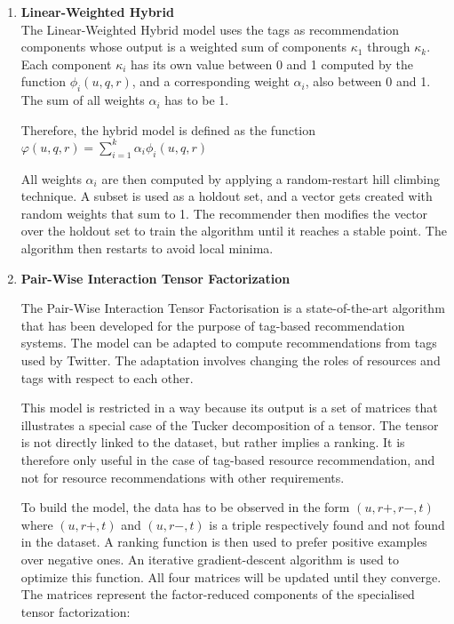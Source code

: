 \documentclass{article}
\begin{document}
\begin{enumerate}
\item \textbf{Linear-Weighted Hybrid}\\

The Linear-Weighted Hybrid model uses the tags as recommendation components whose output is a weighted sum of components $\kappa_1$ through $\kappa_k$. 
Each component $\kappa_i$ has its own value between 0 and 1 computed by the function $\phi_i (u,q,r)$, and a corresponding weight $\alpha_i$, also between
0 and 1. The sum of all weights $\alpha_i$ has to be 1.

Therefore, the hybrid model is defined as the function $\varphi (u, q, r) = \sum\limits_{i = 1}^k \alpha_i \phi_i (u,q,r)$

All weights $\alpha_i$ are then computed by applying a random-restart hill climbing technique. A subset is used as a holdout set, and a vector gets created with random weights that sum to 1. The recommender then modifies the vector over the holdout set to train the algorithm until it reaches a stable point. The algorithm then restarts to avoid local minima.

\item \textbf{Pair-Wise Interaction Tensor Factorization} 

The Pair-Wise Interaction Tensor Factorisation is a state-of-the-art algorithm that has been developed for the purpose of tag-based recommendation systems. The model can be adapted to compute recommendations from tags used by Twitter. The adaptation involves changing the roles of resources and tags with respect to each other.
	
This model is restricted in a way because its output is a set of matrices that illustrates a special case of the Tucker decomposition of a tensor. The tensor is not directly linked to the dataset, but rather implies a ranking. It is therefore only useful in the case of tag-based resource recommendation, and not for resource recommendations with other requirements.
	
To build the model, the data has to be observed in the form $(u, r+, r-, t)$ where $(u, r+, t)$ and $(u, r-, t)$ is a triple respectively
found and not found in the dataset. A ranking function is then used to prefer positive examples over negative ones. An iterative gradient-descent
algorithm is used to optimize this function. All four matrices will be updated until they converge. The matrices represent the factor-reduced components
of the specialised tensor factorization:


\end{enumerate}
\end{document}
